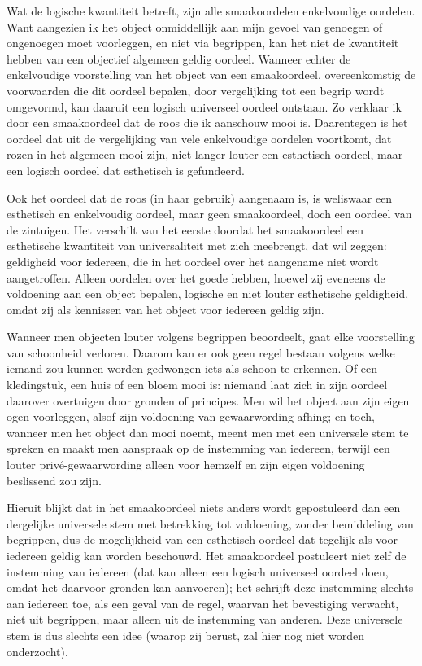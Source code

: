 Wat de logische kwantiteit betreft, zijn alle smaakoordelen enkelvoudige oordelen. Want aangezien ik het object onmiddellijk aan mijn gevoel van genoegen of ongenoegen moet voorleggen, en niet via begrippen, kan het niet de kwantiteit hebben van een objectief algemeen geldig oordeel. Wanneer echter de enkelvoudige voorstelling van het object van een smaakoordeel, overeenkomstig de voorwaarden die dit oordeel bepalen, door vergelijking tot een begrip wordt omgevormd, kan daaruit een logisch universeel oordeel ontstaan. Zo verklaar ik door een smaakoordeel dat de roos die ik aanschouw mooi is. Daarentegen is het oordeel dat uit de vergelijking van vele enkelvoudige oordelen voortkomt, dat rozen in het algemeen mooi zijn, niet langer louter een esthetisch oordeel, maar een logisch oordeel dat esthetisch is gefundeerd.

Ook het oordeel dat de roos (in haar gebruik) aangenaam is, is weliswaar een esthetisch en enkelvoudig oordeel, maar geen smaakoordeel, doch een oordeel van de zintuigen. Het verschilt van het eerste doordat het smaakoordeel een esthetische kwantiteit van universaliteit met zich meebrengt, dat wil zeggen: geldigheid voor iedereen, die in het oordeel over het aangename niet wordt aangetroffen. Alleen oordelen over het goede hebben, hoewel zij eveneens de voldoening aan een object bepalen, logische en niet louter esthetische geldigheid, omdat zij als kennissen van het object voor iedereen geldig zijn.

Wanneer men objecten louter volgens begrippen beoordeelt, gaat elke voorstelling van schoonheid verloren. Daarom kan er ook geen regel bestaan volgens welke iemand zou kunnen worden gedwongen iets als schoon te erkennen. Of een kledingstuk, een huis of een bloem mooi is: niemand laat zich in zijn oordeel daarover overtuigen door gronden of principes. Men wil het object aan zijn eigen ogen voorleggen, alsof zijn voldoening van gewaarwording afhing; en toch, wanneer men het object dan mooi noemt, meent men met een universele stem te spreken en maakt men aanspraak op de instemming van iedereen, terwijl een louter privé-gewaarwording alleen voor hemzelf en zijn eigen voldoening beslissend zou zijn.

Hieruit blijkt dat in het smaakoordeel niets anders wordt gepostuleerd dan een dergelijke universele stem met betrekking tot voldoening, zonder bemiddeling van begrippen, dus de mogelijkheid van een esthetisch oordeel dat tegelijk als voor iedereen geldig kan worden beschouwd. Het smaakoordeel postuleert niet zelf de instemming van iedereen (dat kan alleen een logisch universeel oordeel doen, omdat het daarvoor gronden kan aanvoeren); het schrijft deze instemming slechts aan iedereen toe, als een geval van de regel, waarvan het bevestiging verwacht, niet uit begrippen, maar alleen uit de instemming van anderen. Deze universele stem is dus slechts een idee (waarop zij berust, zal hier nog niet worden onderzocht).

